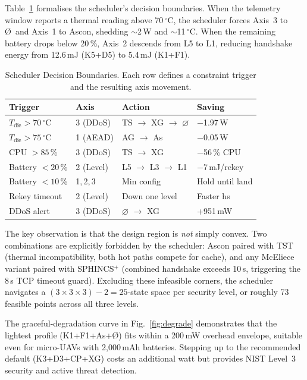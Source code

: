 \documentclass[conference]{IEEEtran}
\begin{document}
Table~\ref{tab:degrade} formalises the scheduler's decision
boundaries.  When the telemetry window reports a thermal reading
above 70\,$^\circ$C, the scheduler forces Axis~3 to \O\ and Axis~1
to Ascon, shedding ${\sim}$2\,W and ${\sim}$11\,$^\circ$C.
When the remaining battery drops below 20\,\%, Axis~2 descends from
L5 to L1, reducing handshake energy from 12.6\,mJ (K5+D5) to
5.4\,mJ (K1+F1).

\begin{table}[t]
\centering
\caption{Scheduler Decision Boundaries.  Each row defines a
  constraint trigger and the resulting axis movement.}
\label{tab:degrade}
\footnotesize
\setlength{\tabcolsep}{2.5pt}
\begin{tabular}{@{}l l l l@{}}
\toprule
\textbf{Trigger} & \textbf{Axis} & \textbf{Action} & \textbf{Saving} \\
\midrule
$T_{\text{die}} > 70\,^\circ$C & 3 (DDoS) & TS $\to$ XG $\to$ $\varnothing$ &  $-$1.97\,W \\
$T_{\text{die}} > 75\,^\circ$C & 1 (AEAD) & AG $\to$ As & $-$0.05\,W \\
CPU $> 85$\,\% & 3 (DDoS) & TS $\to$ XG & $-$56\,\% CPU \\
Battery $< 20$\,\% & 2 (Level) & L5 $\to$ L3 $\to$ L1 & $-$7\,mJ/rekey \\
Battery $< 10$\,\% & 1,\,2,\,3 & Min config & Hold until land \\
Rekey timeout & 2 (Level) & Down one level & Faster hs \\
DDoS alert & 3 (DDoS) & $\varnothing$ $\to$ XG & +951\,mW \\
\bottomrule
\end{tabular}
\end{table}

The key observation is that the design region is \emph{not} simply
convex.  Two combinations are explicitly forbidden by the scheduler:
Ascon paired with TST (thermal incompatibility, both hot paths compete
for cache), and any McEliece variant paired with SPHINCS$^+$ (combined
handshake exceeds 10\,s, triggering the 8\,s TCP timeout guard).
Excluding these infeasible corners, the scheduler navigates a
$(3 \times 3 \times 3) - 2 = 25$-state space per security level,
or roughly 73 feasible points across all three levels.

The graceful-degradation curve in Fig.~\ref{fig:degrade} demonstrates
that the lightest profile (K1+F1+As+\O) fits within a 200\,mW
overhead envelope, suitable even for micro-UAVs with 2{,}000\,mAh
batteries.  Stepping up to the recommended default (K3+D3+CP+XG)
costs an additional watt but provides NIST Level~3 security and
active threat detection.
\end{document}
